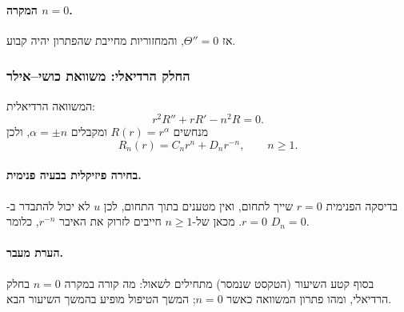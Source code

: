 \paragraph{המקרה \(n=0\).}
אז \(\Theta''=0\), והמחזוריות מחייבת שהפתרון יהיה קבוע.

\subsubsection*{החלק הרדיאלי: משוואת כושי--אילר}
המשוואה הרדיאלית:
\begin{equation}
r^2R''+rR'-n^2R=0.
\end{equation}
מנחשים \(R(r)=r^\alpha\) ומקבלים \(\alpha=\pm n\), ולכן
\begin{equation}
R_n(r)=C_n r^n+D_n r^{-n},\qquad n\ge 1.
\end{equation}

\paragraph{בחירה פיזיקלית בבעיה פנימית.}
בדיסקה הפנימית $r=0$ שייך לתחום, ואין מטענים בתוך התחום, לכן $u$ לא יכול להתבדר ב-$r=0$.
מכאן של-$n\ge 1$ חייבים לזרוק את האיבר \(r^{-n}\), כלומר \(D_n=0\).

\paragraph{הערת מעבר.}
בסוף קטע השיעור (הטקסט שנמסר) מתחילים לשאול: מה קורה במקרה \(n=0\) בחלק הרדיאלי, ומהו פתרון המשוואה כאשר \(n=0\); המשך הטיפול מופיע בהמשך השיעור הבא.


